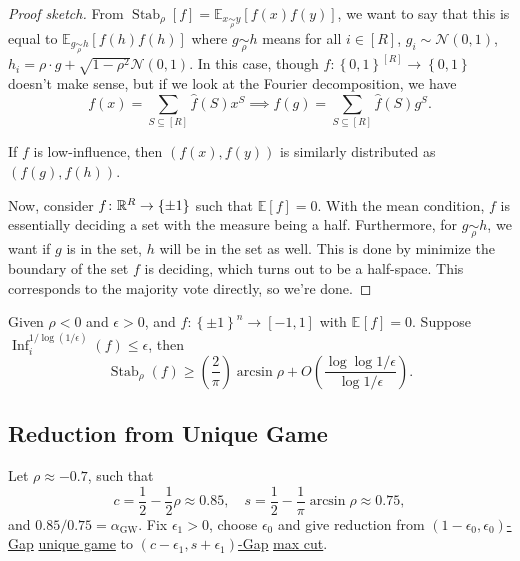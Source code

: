 \begin{proof}[Proof sketch]
	From \(\mathop{\mathrm{Stab}}_\rho [f] = \mathbb{E}_{x \underset{\rho }{\sim } y}\left[f(x) f(y) \right] \), we want to say that this is equal to \(\mathbb{E}_{g \underset{\rho }{\sim } h}\left[ f(h) f(h) \right] \) where \(g \underset{\rho }{\sim } h\) means for all \(i\in [R]\), \(g_i \sim \mathcal{N} (0, 1)\), \(h_i = \rho \cdot g + \sqrt{1 - \rho ^{2} }\mathcal{N} (0, 1) \). In this case, though \(f\colon \left\{ 0, 1 \right\} ^[R] \to \left\{ 0, 1 \right\} \) doesn't make sense, but if we look at the Fourier decomposition, we have
	\[
		f(x) = \sum_{S \subseteq [R]} \hat{f} (S) x^S \implies f(g) = \sum_{S \subseteq [R]} \hat{f} (S) g^S.
	\]

	\begin{remark}
		If \(f\) is low-influence, then \((f(x), f(y))\) is similarly distributed as \((f(g), f(h))\).
	\end{remark}
	Now, consider \(f\colon \mathbb{\MakeUppercase{r}} ^R \to \left\{ \pm 1 \right\} \) such that \(\mathbb{E}\left[f \right] =0\). With the mean condition, \(f\) is essentially deciding a set with the measure being a half. Furthermore, for \(g \underset{\rho }{\sim } h\), we want if \(g\) is in the set, \(h\) will be in the set as well. This is done by minimize the boundary of the set \(f\) is deciding, which turns out to be a half-space. This corresponds to the majority vote directly, so we're done.
\end{proof}

\begin{corollary}
	Given \(\rho < 0\) and \(\epsilon > 0\), and \(f\colon \left\{ \pm 1 \right\} ^n \to [-1, 1]\) with \(\mathbb{E}_{}\left[f \right] = 0\). Suppose \(\mathop{\mathrm{Inf}}_i^{1 / \log (1 / \epsilon )}(f)\leq \epsilon \), then
	\[
		\mathop{\mathrm{Stab}}\nolimits_\rho (f) \geq \left( \frac{2}{\pi } \right) \arcsin \rho + O\left( \frac{\log \log 1 / \epsilon }{\log 1 / \epsilon } \right).
	\]
\end{corollary}

\subsection{Reduction from Unique Game}
Let \(\rho \approx -0.7\), such that
\[
	c = \frac{1}{2} - \frac{1}{2}\rho \approx 0.85, \quad s = \frac{1}{2} - \frac{1}{\pi }\arcsin \rho \approx 0.75,
\]
and \(0.85 / 0.75 = \alpha _{\mathrm{GW} }\). Fix \(\epsilon _1 > 0\), choose \(\epsilon _0\) and give reduction from \hyperref[def:c-s-Gap]{\((1-\epsilon _0, \epsilon _0)\)-Gap} \hyperref[prb:unique-game]{unique game} to \hyperref[def:c-s-Gap]{\((c-\epsilon _1, s+\epsilon _1)\)-Gap} \hyperref[prb:max-cut]{max cut}.

